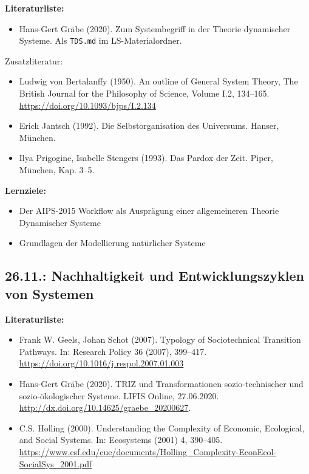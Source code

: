 \documentclass[11pt,a4paper]{article}
\begin{document}
\textbf{Literaturliste:}
\begin{itemize}
\item Hans-Gert Gräbe (2020).  Zum Systembegriff in der Theorie dynamischer
  Systeme.  Als \texttt{TDS.md} im LS-Materialordner.
\end{itemize}
Zusatzliteratur:
\begin{itemize}[noitemsep]
\item Ludwig von Bertalanffy (1950). An outline of General System Theory, The
  British Journal for the Philosophy of Science, Volume I.2, 134–165.\\
  \url{https://doi.org/10.1093/bjps/I.2.134}
\item Erich Jantsch (1992). Die Selbstorganisation des Universums. Hanser,
  München.
\item Ilya Prigogine, Isabelle Stengers (1993). Das Pardox der Zeit. Piper,
  München, Kap. 3--5.
\end{itemize}

\textbf{Lernziele:}
\begin{itemize}[noitemsep]
\item Der AIPS-2015 Workflow als Ausprägung einer allgemeineren Theorie
  Dynamischer Systeme 
\item Grundlagen der Modellierung natürlicher Systeme
\end{itemize}

\subsection{26.11.: Nachhaltigkeit und Entwicklungszyklen von Systemen}

\textbf{Literaturliste:}
\begin{itemize}[noitemsep]
\item Frank W. Geels, Johan Schot (2007). Typology of Sociotechnical
  Transition Pathways. In: Research Policy 36 (2007), 399–417.\\
  \url{https://doi.org/10.1016/j.respol.2007.01.003} 
\item Hans-Gert Gräbe (2020). TRIZ und Transformationen sozio-technischer und
  sozio-ökolo\-gischer Systeme. LIFIS Online, 27.06.2020.\\
  \url{http://dx.doi.org/10.14625/graebe_20200627}.
\item C.S. Holling (2000). Understanding the Complexity of Economic,
  Ecological, and Social Systems. In: Ecosystems (2001) 4, 390–405.\\
  {\scriptsize \url{https://www.esf.edu/cue/documents/Holling_Complexity-EconEcol-SocialSys_2001.pdf}}
\end{itemize}
\end{document}
